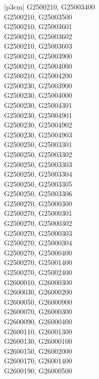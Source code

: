\begin{customLongTable}{ |p{3cm}| }
G2500210, G25003400 \\ \hline
G2500210, G25003500 \\ \hline
G2500210, G25003601 \\ \hline
G2500210, G25003602 \\ \hline
G2500210, G25003603 \\ \hline
G2500210, G25003900 \\ \hline
G2500210, G25004000 \\ \hline
G2500210, G25004200 \\ \hline
G2500230, G25003900 \\ \hline
G2500230, G25004000 \\ \hline
G2500230, G25004301 \\ \hline
G2500230, G25004901 \\ \hline
G2500230, G25004902 \\ \hline
G2500230, G25004903 \\ \hline
G2500250, G25003301 \\ \hline
G2500250, G25003302 \\ \hline
G2500250, G25003303 \\ \hline
G2500250, G25003304 \\ \hline
G2500250, G25003305 \\ \hline
G2500250, G25003306 \\ \hline
G2500270, G25000300 \\ \hline
G2500270, G25000301 \\ \hline
G2500270, G25000302 \\ \hline
G2500270, G25000303 \\ \hline
G2500270, G25000304 \\ \hline
G2500270, G25000400 \\ \hline
G2500270, G25001400 \\ \hline
G2500270, G25002400 \\ \hline
G2600010, G26000300 \\ \hline
G2600030, G26000200 \\ \hline
G2600050, G26000900 \\ \hline
G2600070, G26000300 \\ \hline
G2600090, G26000400 \\ \hline
G2600110, G26001300 \\ \hline
G2600130, G26000100 \\ \hline
G2600150, G26002000 \\ \hline
G2600170, G26001400 \\ \hline
G2600190, G26000500 \\ \hline

\end{customLongTable}
